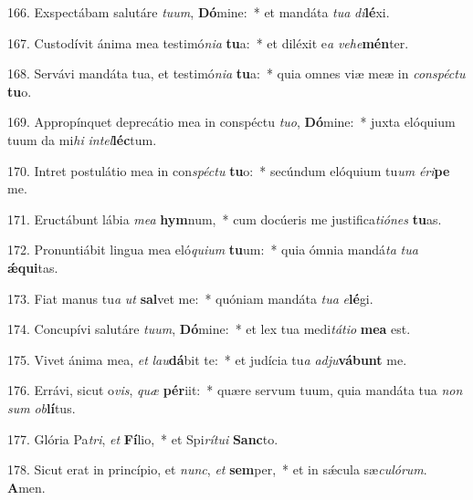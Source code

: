 166. Exspectábam salutáre \textit{tu}\textit{um}, \textbf{Dó}mine:~*  et mandáta \textit{tu}\textit{a} \textit{di}\textbf{lé}xi.\

167. Custodívit ánima mea testimó\textit{ni}\textit{a} \textbf{tu}a:~*  et diléxit e\textit{a} \textit{ve}\textit{he}\textbf{mén}ter.\

168. Servávi mandáta tua, et testimó\textit{ni}\textit{a} \textbf{tu}a:~*  quia omnes viæ meæ in \textit{con}\textit{spéc}\textit{tu} \textbf{tu}o.\

169. Appropínquet deprecátio mea in conspéctu \textit{tu}\textit{o}, \textbf{Dó}mine:~*  juxta elóquium tuum da mi\textit{hi} \textit{in}\textit{tel}\textbf{léc}tum.\

170. Intret postulátio mea in con\textit{spéc}\textit{tu} \textbf{tu}o:~*  secúndum elóquium tu\textit{um} \textit{é}\textit{ri}\textbf{pe} me.\

171. Eructábunt lábia \textit{me}\textit{a} \textbf{hym}num,~*  cum docúeris me justifica\textit{ti}\textit{ó}\textit{nes} \textbf{tu}as.\

172. Pronuntiábit lingua mea eló\textit{qui}\textit{um} \textbf{tu}um:~*  quia ómnia mandá\textit{ta} \textit{tu}\textit{a} \textbf{ǽ}\textbf{qui}tas.\

173. Fiat manus tu\textit{a} \textit{ut} \textbf{sal}vet me:~*  quóniam mandáta \textit{tu}\textit{a} \textit{e}\textbf{lé}gi.\

174. Concupívi salutáre \textit{tu}\textit{um}, \textbf{Dó}mine:~*  et lex tua medi\textit{tá}\textit{ti}\textit{o} \textbf{me}\textbf{a} est.\

175. Vivet ánima mea, \textit{et} \textit{lau}\textbf{dá}bit te:~*  et judícia tu\textit{a} \textit{ad}\textit{ju}\textbf{vá}\textbf{bunt} me.\

176. Errávi, sicut o\textit{vis}, \textit{quæ} \textbf{pér}iit:~*  quære servum tuum, quia mandáta tua \textit{non} \textit{sum} \textit{ob}\textbf{lí}tus.\

177. Glória Pa\textit{tri}, \textit{et} \textbf{Fí}lio,~*  et Spi\textit{rí}\textit{tu}\textit{i} \textbf{Sanc}to.\

178. Sicut erat in princípio, et \textit{nunc}, \textit{et} \textbf{sem}per,~*  et in sǽcula sæ\textit{cu}\textit{ló}\textit{rum}. \textbf{A}men.\

